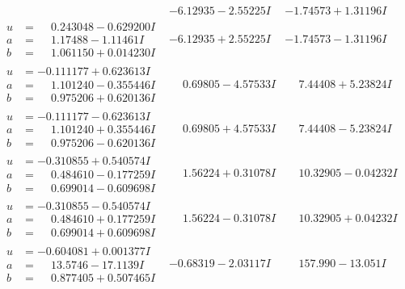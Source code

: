 \documentclass[1p]{elsarticle_modified}
\theoremstyle{definition}
\begin{document}
$$\begin{array}{c|c|c}
 & -6.12935 - 2.55225 I & -1.74573 + 1.31196 I \\ \hline\begin{aligned}
u &= \phantom{-}0.243048 - 0.629200 I \\
a &= \phantom{-}1.17488 - 1.11461 I \\
b &= \phantom{-}1.061150 + 0.014230 I\end{aligned}
 & -6.12935 + 2.55225 I & -1.74573 - 1.31196 I \\ \hline\begin{aligned}
u &= -0.111177 + 0.623613 I \\
a &= \phantom{-}1.101240 - 0.355446 I \\
b &= \phantom{-}0.975206 + 0.620136 I\end{aligned}
 & \phantom{-}0.69805 - 4.57533 I & \phantom{-}7.44408 + 5.23824 I \\ \hline\begin{aligned}
u &= -0.111177 - 0.623613 I \\
a &= \phantom{-}1.101240 + 0.355446 I \\
b &= \phantom{-}0.975206 - 0.620136 I\end{aligned}
 & \phantom{-}0.69805 + 4.57533 I & \phantom{-}7.44408 - 5.23824 I \\ \hline\begin{aligned}
u &= -0.310855 + 0.540574 I \\
a &= \phantom{-}0.484610 - 0.177259 I \\
b &= \phantom{-}0.699014 - 0.609698 I\end{aligned}
 & \phantom{-}1.56224 + 0.31078 I & \phantom{-}10.32905 - 0.04232 I \\ \hline\begin{aligned}
u &= -0.310855 - 0.540574 I \\
a &= \phantom{-}0.484610 + 0.177259 I \\
b &= \phantom{-}0.699014 + 0.609698 I\end{aligned}
 & \phantom{-}1.56224 - 0.31078 I & \phantom{-}10.32905 + 0.04232 I \\ \hline\begin{aligned}
u &= -0.604081 + 0.001377 I \\
a &= \phantom{-}13.5746 - 17.1139 I \\
b &= \phantom{-}0.877405 + 0.507465 I\end{aligned}
 & -0.68319 - 2.03117 I & \phantom{-}157.990 - 13.051 I \\ \hline\begin{aligned}

\end{aligned}
\end{array}$$
\end{document}
